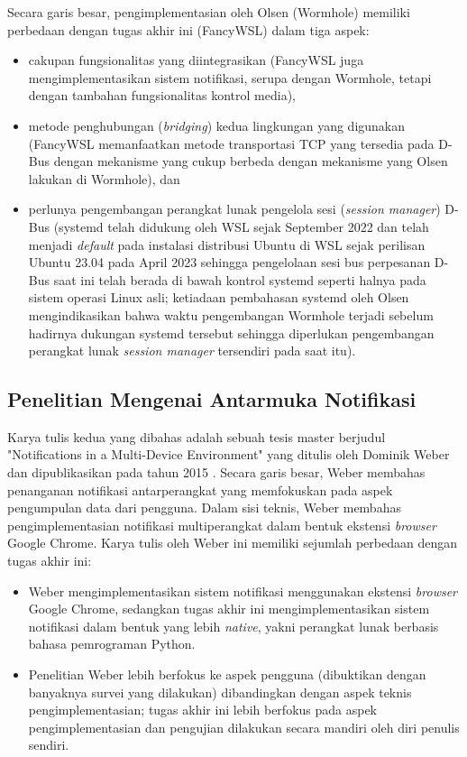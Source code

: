 Secara garis besar, pengimplementasian oleh Olsen (Wormhole) memiliki perbedaan dengan tugas akhir ini (FancyWSL) dalam tiga aspek:
\begin{itemize}
    \item cakupan fungsionalitas yang diintegrasikan (FancyWSL juga mengimplementasikan sistem notifikasi, serupa dengan Wormhole, tetapi dengan tambahan fungsionalitas kontrol media),
    \item metode penghubungan (\textit{bridging}) kedua lingkungan yang digunakan (FancyWSL memanfaatkan metode transportasi TCP yang tersedia pada D-Bus dengan mekanisme yang cukup berbeda dengan mekanisme yang Olsen lakukan di Wormhole), dan
    \item perlunya pengembangan perangkat lunak pengelola sesi (\textit{session manager}) D-Bus (systemd telah didukung oleh WSL sejak September 2022 \cite{systemd-support-is-now-available-in-wsl} dan telah menjadi \textit{default} pada instalasi distribusi Ubuntu di WSL sejak perilisan Ubuntu 23.04 pada April 2023 \cite{ubuntu-2304-release-roundup-systemd-now-becomes-default-for-ubuntu-on-wsl} sehingga pengelolaan sesi bus perpesanan D-Bus saat ini telah berada di bawah kontrol systemd seperti halnya pada sistem operasi Linux asli; ketiadaan pembahasan systemd oleh Olsen mengindikasikan bahwa waktu pengembangan Wormhole terjadi sebelum hadirnya dukungan systemd tersebut sehingga diperlukan pengembangan perangkat lunak \textit{session manager} tersendiri pada saat itu).
\end{itemize}

\subsection{Penelitian Mengenai Antarmuka Notifikasi}

Karya tulis kedua yang dibahas adalah sebuah tesis master berjudul "Notifications in a Multi-Device Environment" yang ditulis oleh Dominik Weber dan dipublikasikan pada tahun 2015 \cite{weber2015notifications}. Secara garis besar, Weber membahas penanganan notifikasi antarperangkat yang memfokuskan pada aspek pengumpulan data dari pengguna. Dalam sisi teknis, Weber membahas pengimplementasian notifikasi multiperangkat dalam bentuk ekstensi \textit{browser} Google Chrome. Karya tulis oleh Weber ini memiliki sejumlah perbedaan dengan tugas akhir ini:
\begin{itemize}
    \item Weber mengimplementasikan sistem notifikasi menggunakan ekstensi \textit{browser} Google Chrome, sedangkan tugas akhir ini mengimplementasikan sistem notifikasi dalam bentuk yang lebih \textit{native}, yakni perangkat lunak berbasis bahasa pemrograman Python.

    \item Penelitian Weber lebih berfokus ke aspek pengguna (dibuktikan dengan banyaknya survei yang dilakukan) dibandingkan dengan aspek teknis pengimplementasian; tugas akhir ini lebih berfokus pada aspek pengimplementasian dan pengujian dilakukan secara mandiri oleh diri penulis sendiri.
\end{itemize}


